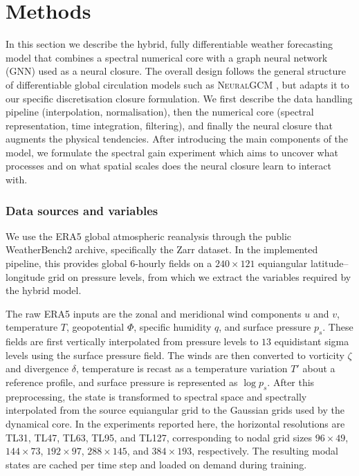 \chapter{Methods}
\label{Methods}

In this section we describe the hybrid, fully differentiable weather forecasting model that combines a spectral numerical core with a graph neural network (GNN) used as a neural closure. The overall design follows the general structure of differentiable global circulation models such as \textsc{NeuralGCM} \cite{neuralgcm}, but adapts it to our specific discretisation closure formulation. We first describe the data handling pipeline (interpolation, normalisation), then the numerical core (spectral representation, time integration, filtering), and finally the neural closure that augments the physical tendencies. After introducing the main components of the model, we formulate the spectral gain experiment which aims to uncover what processes and on what spatial scales does the neural closure learn to interact with.

\subsection{Data sources and variables}
\label{sec:datatraining}
We use the ERA5 global atmospheric reanalysis \cite{hersbach2020era5} through the public WeatherBench2 archive, specifically the Zarr dataset. In the implemented pipeline, this provides global 6-hourly fields on a \(240 \times 121\) equiangular latitude--longitude grid on pressure levels, from which we extract the variables required by the hybrid model.

The raw ERA5 inputs are the zonal and meridional wind components \(u\) and \(v\), temperature \(T\), geopotential \(\Phi\), specific humidity \(q\), and surface pressure \(p_s\). These fields are first vertically interpolated from pressure levels to \(13\) equidistant sigma levels using the surface pressure field. The winds are then converted to vorticity \(\zeta\) and divergence \(\delta\), temperature is recast as a temperature variation \(T'\) about a reference profile, and surface pressure is represented as \(\log p_s\). After this preprocessing, the state is transformed to spectral space and spectrally interpolated from the source equiangular grid to the Gaussian grids used by the dynamical core. In the experiments reported here, the horizontal resolutions are TL31, TL47, TL63, TL95, and TL127, corresponding to nodal grid sizes \(96 \times 49\), \(144 \times 73\), \(192 \times 97\), \(288 \times 145\), and \(384 \times 193\), respectively. The resulting modal states are cached per time step and loaded on demand during training.


